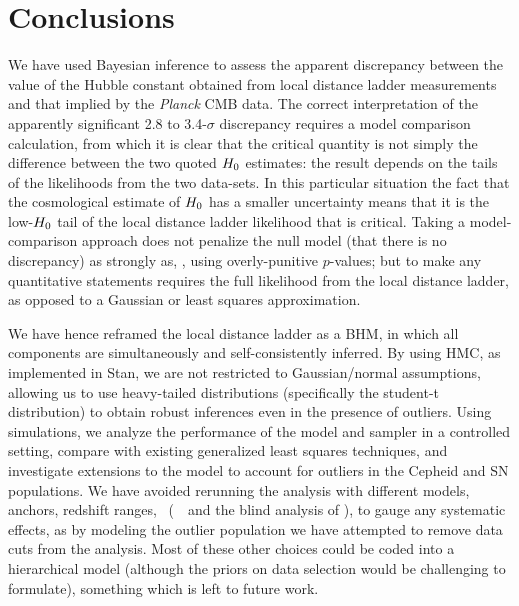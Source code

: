 \documentclass[a4paper,fleqn,usenatbib]{mnras}
\newcommand{\riess}{\citetalias{Riess_etal:2016}}
\begin{document}
{%

\section{Conclusions}
\label{section:conc}

We have used Bayesian inference to assess the apparent discrepancy between the value of the Hubble constant obtained from local distance ladder measurements and that implied by the {\em Planck} CMB data.  The correct interpretation of the apparently significant 2.8 to 3.4-$\sigma$ discrepancy requires a model comparison calculation, from which it is clear that the critical quantity is not simply the difference between the two quoted $H_0$ estimates: the result depends on the tails of the likelihoods from the two data-sets. In this particular situation the fact that the cosmological estimate of $H_0$ has a smaller uncertainty means that it is the low-$H_0$ tail of the local distance ladder likelihood that is critical.  Taking a model-comparison approach does not penalize the null model (that there is no discrepancy) as strongly as, \eg, using overly-punitive $p$-values; but to make any quantitative statements requires the full likelihood from the local distance ladder, as opposed to a Gaussian or least squares approximation.

We have hence reframed the local distance ladder as a BHM, in which all components are simultaneously and self-consistently inferred.  By using HMC, as implemented in Stan, we are not restricted to Gaussian/normal assumptions, allowing us to use heavy-tailed distributions (specifically the student-t distribution) to obtain robust inferences even in the presence of outliers.  Using simulations, we analyze the performance of the model and sampler in a controlled setting, compare with existing generalized least squares techniques, and investigate extensions to the model to account for outliers in the Cepheid and SN populations.
We have avoided rerunning the analysis with different models, anchors, redshift ranges, \etc\ (\cf\ \riess\ and the blind analysis of \citealt{Zhang_etal:2017}), to gauge any systematic effects, as by modeling the outlier population we have attempted to remove data cuts from the analysis. Most of these other choices could be coded into a hierarchical model (although the priors on data selection would be challenging to formulate), something which is left to future work.

}
\end{document}
